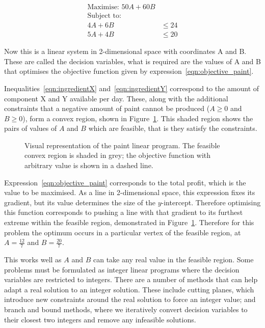 \begin{align}
\text{Maximise: } 50 A + 60 B & \label{eqn:objective_paint} \\
\text{Subject to: } & \nonumber \\
4 A + 6 B &\leq 24 \label{eqn:ingredientX} \\
5 A + 4 B &\leq 20 \label{eqn:ingredientY}
\end{align}

Now this is a linear system in 2-dimensional space with coordinates A and B.
These are called the decision variables, what is required are the values of A
and B that optimises the objective function given by
expression~\ref{eqn:objective_paint}.

Inequalities~\ref{eqn:ingredientX} and~\ref{eqn:ingredientY} correspond to the
amount of component X and Y available per day. These, along with the additional
constraints that a negative amount of paint cannot be produced (\(A \geq 0\) and
\(B \geq 0\)), form a convex region, shown in Figure~\ref{fig:paint_lp}.
This shaded region shows the pairs of values of \(A\) and \(B\) which are
feasible, that is they satisfy the constraints.

\begin{figure}
\begin{center}

\end{center}
\caption{Visual representation of the paint linear program. The feasible convex
region is shaded in grey; the objective function with arbitrary value is shown
in a dashed line.}
\label{fig:paint_lp}
\end{figure}

Expression~\ref{eqn:objective_paint} corresponds to the total profit, which is
the value to be maximised. As a line in 2-dimensional space,
this expression fixes its gradient, but its value determines the size of the
\(y\)-intercept. Therefore optimising this function corresponds to pushing a line
with that gradient to its furthest extreme within the feasible region,
demonstrated in Figure~\ref{fig:paint_lp}.
Therefore for this problem the optimum occurs in a particular vertex of the
feasible region, at \(A = \frac{12}{7}\) and \(B = \frac{20}{7}\).

This works well as \(A\) and \(B\) can take any real value in the feasible region.
Some problems must be formulated as integer linear programs where the decision
variables are restricted to integers. There are a number of methods that can
help adapt a real solution to an integer solution. These include cutting
planes, which introduce new constraints around the real solution to force an
integer value; and branch and bound methods, where we iteratively convert
decision variables to their closest two integers and remove any infeasible
solutions.

